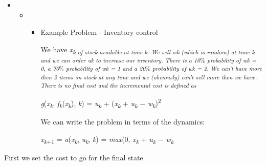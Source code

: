 \documentclass[12pt,twoside]{article}
\begin{document}
\vspace{\baselineskip}
\begin{itemize}
	\item \begin{itemize}
	\item \begin{itemize}
	\item Example Problem - Inventory control\par


\vspace{\baselineskip}
{\fontsize{10pt}{12.0pt}\selectfont We have \textit{x\textsubscript{k of stock available at time k. We sell wk (which is random) at time k and we can order uk to increase our inventory. There is a 10$\%$  probability of wk = 0, a 70$\%$  probability of wk = 1 and a 20$\%$  probability of wk = 2. We can’t have more then 2 items on stock at any time and we (obviously) can’t sell more then we have. There is no final cost and the incremental cost is defined as}}\par}\par


\vspace{\baselineskip}
\begin{Center}
{\fontsize{10pt}{12.0pt}\selectfont \textit{g}(\textit{x\textsubscript{k}}, \textit{f\textsubscript{k}}(\textit{x\textsubscript{k}}), \textit{k}) = \textit{u\textsubscript{k} }+ (\textit{x\textsubscript{k} }+ \textit{u\textsubscript{k} }$-$  \textit{w\textsubscript{k}})\textsuperscript{2}\par}
\end{Center}\par

{\fontsize{10pt}{12.0pt}\selectfont We can write the problem in terms of the dynamics:\par}\par

\begin{Center}
{\fontsize{10pt}{12.0pt}\selectfont \textit{x\textsubscript{k}}\textsubscript{+1} = \textit{a}(\textit{x\textsubscript{k}}, \textit{u\textsubscript{k}}, \textit{k}) = \textit{max}(0, \textit{x\textsubscript{k} }+ \textit{u\textsubscript{k} }$-$  \textit{w\textsubscript{k}}\par}
\end{Center}\par


\vspace{\baselineskip}

\end{itemize}
\end{itemize}
\end{itemize}
\vspace{\baselineskip}
{\fontsize{10pt}{12.0pt}\selectfont First we set the cost to go for the final state\par}\par
\end{document}
